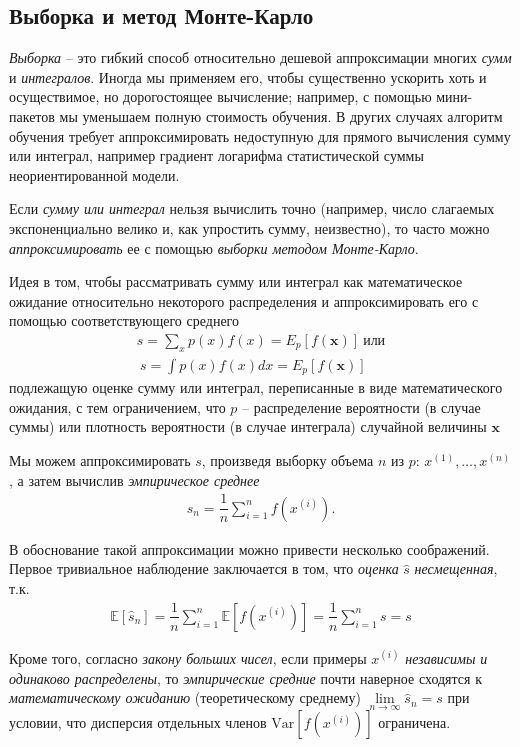 \documentclass[%
	11pt,
	a4paper,
	utf8,
]{article}
\begin{document}
\subsection{Выборка и метод Монте-Карло}

\emph{Выборка} -- это гибкий способ относительно дешевой аппроксимации многих \emph{сумм} и \emph{интегралов}. Иногда мы применяем его, чтобы существенно ускорить хоть и осуществимое, но дорогостоящее вычисление; например, с помощью мини-пакетов мы уменьшаем полную стоимость обучения. В других случаях алгоритм обучения требует аппроксимировать недоступную для прямого вычисления сумму или интеграл, например градиент логарифма статистической суммы неориентированной модели.

Если \emph{сумму или интеграл} нельзя вычислить точно (например, число слагаемых экспоненциально велико и, как упростить сумму, неизвестно), то часто можно \emph{аппроксимировать} ее с помощью \emph{выборки методом Монте-Карло}.

Идея в том, чтобы рассматривать сумму или интеграл как математическое ожидание относительно некоторого распределения и аппроксимировать его с помощью соответствующего среднего
\begin{align}
	s = \sum_x p(x)f(x) = E_p[f(\mathbf{x})] \ \text{или}\\ \ s = \int p(x)f(x)dx = E_p[f(\mathbf{x})]
\end{align}
подлежащую оценке сумму или интеграл, переписанные в виде математического ожидания, с тем ограничением, что $ p $ -- распределение вероятности (в случае суммы) или плотность вероятности (в случае интеграла) случайной величины $ \mathbf{x} $

Мы можем аппроксимировать $ s $, произведя выборку объема $ n $ из $ p $: $ x^{(1)}, \ldots, x^{(n)} $, а затем вычислив \emph{эмпирическое среднее}
\begin{align*}
	\hat{s}_n = \dfrac{1}{n} \sum_{i=1}^n f(x^{(i)}).
\end{align*}

В обоснование такой аппроксимации можно привести несколько соображений. Первое тривиальное наблюдение заключается в том, что \emph{оценка} $ \hat{s} $ \emph{несмещенная}, т.к.
\begin{align*}
	\mathbb{E}[\hat{s}_n] = \dfrac{1}{n} \sum_{i=1}^n \mathbb{E}[ f(x^{(i)}) ] = \dfrac{1}{n} \sum_{i=1}^{n}s = s
\end{align*}

Кроме того, согласно \emph{закону больших чисел}, если примеры $ x^{(i)} $ \emph{независимы и одинаково распределены}, то \emph{эмпирические средние} почти наверное сходятся к \emph{математическому ожиданию} (теоретическому среднему) $ \lim\limits_{n \rightarrow \infty} \hat{s}_n = s $ при условии, что дисперсия отдельных членов $ \text{Var}[ f(x^{(i)}) ] $ ограничена.
\end{document}
